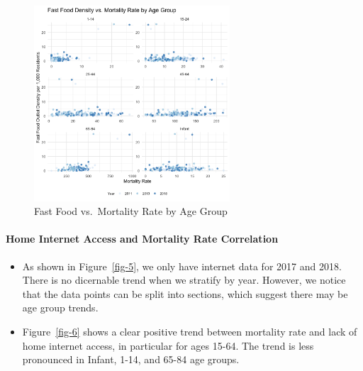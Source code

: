 \documentclass[
  letterpaper,
  DIV=11,
  numbers=noendperiod]{scrartcl}
\let\oldparagraph\paragraph
\renewcommand{\paragraph}[1]{\oldparagraph{#1}\mbox{}}
\begin{document}
\begin{figure}

{\centering \includegraphics[width=0.65\textwidth,height=\textheight]{figures/fastfd_vs_mortality_by_age.png}

}

\caption{\label{fig-4}Fast Food vs.~Mortality Rate by Age Group}

\end{figure}

\hypertarget{home-internet-access-and-mortality-rate-correlation}{%
\paragraph{Home Internet Access and Mortality Rate
Correlation}\label{home-internet-access-and-mortality-rate-correlation}}

\begin{itemize}
\item
  As shown in Figure~\ref{fig-5}, we only have internet data for 2017
  and 2018. There is no dicernable trend when we stratify by year.
  However, we notice that the data points can be split into sections,
  which suggest there may be age group trends.
\item
  Figure~\ref{fig-6} shows a clear positive trend between mortality rate
  and lack of home internet access, in particular for ages 15-64. The
  trend is less pronounced in Infant, 1-14, and 65-84 age groups.
\end{itemize}
\end{document}
